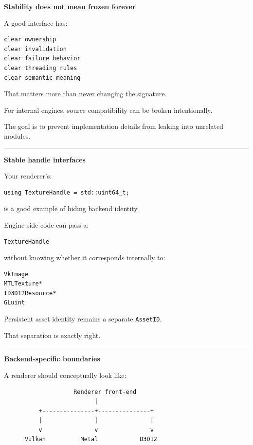 \textbf{Stability does not mean frozen forever}

A good interface has:

\begin{verbatim}
clear ownership
clear invalidation
clear failure behavior
clear threading rules
clear semantic meaning
\end{verbatim}

That matters more than never changing the signature.

For internal engines, source compatibility can be broken intentionally.

The goal is to prevent implementation details from leaking into unrelated modules.

\begin{center}\rule{0.5\linewidth}{0.5pt}\end{center}

\textbf{Stable handle interfaces}

Your renderer's:

\begin{verbatim}
using TextureHandle = std::uint64_t;
\end{verbatim}

is a good example of hiding backend identity.

Engine-side code can pass a:

\begin{verbatim}
TextureHandle
\end{verbatim}

without knowing whether it corresponds internally to:

\begin{verbatim}
VkImage
MTLTexture*
ID3D12Resource*
GLuint
\end{verbatim}

Persistent asset identity remains a separate \texttt{AssetID}.

That separation is exactly right.

\begin{center}\rule{0.5\linewidth}{0.5pt}\end{center}

\textbf{Backend-specific boundaries}

A renderer should conceptually look like:

\begin{verbatim}
                    Renderer front-end
                          |
          +---------------+---------------+
          |               |               |
          v               v               v
      Vulkan          Metal            D3D12
\end{verbatim}

